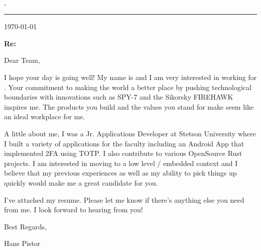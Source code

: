 \documentclass[letterpaper,11pt]{article}
\begin{document}
\begin{center}
\Large\textbf{\name} \\
\address \\
\email, \phone
\end{center}
\noindent\rule{\textwidth}{1pt}

\hfill \today

\vspace{2cm}
\textbf{Re: \position}

\vspace{0.5cm}
Dear \contact \space Team,

\vspace{0.5cm}

I hope your day is going well! My name is \name and I am very interested in working for \contact .
 Your commitment to making the world a better place by pushing technological boundaries with innovations such as SPY-7 and the Sikorsky FIREHAWK inspires me.
 The products you build and the values you stand for make \contact \space seem like an ideal workplace for me.

\vspace{0.5cm}
A little about me, I was a Jr. Applications Developer at Stetson University where I built a variety of applications for the faculty including an Android App that 
implemented 2FA using TOTP. I also contribute to various OpenSource Rust projects. I am interested in moving to a low level / embedded context and I believe
that my previous experiences as well as my ability to pick things up quickly would make me a great candidate for you.

\vspace{0.5cm}
I've attached my resume. Please let me know if there's anything else you need from me. I look forward to hearing from you!

\vspace{2cm}
Best Regards,

\vspace{0.5cm}
Hans Pistor \\
\email \\
\phone
\end{document}
